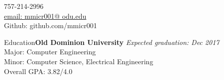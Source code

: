 \documentclass{resume} %
\begin{document}
\vspace{-25 pt}
\begin{center}
757-214-2996\\
\href{mailto:mmicr001@odu.edu}{email: mmicr001@ odu.edu}\\
Github: github.com/mmicr001
\end{center}





\begin{rSection}{Education}{\bf Old Dominion University} \hfill {\em Expected graduation: Dec 2017} \\ 
Major:  Computer Engineering  \\ 
Minor: Computer Science, Electrical Engineering \\
Overall GPA: 3.82/4.0
\end{rSection}


\vspace{-5 pt}


\end{document}

